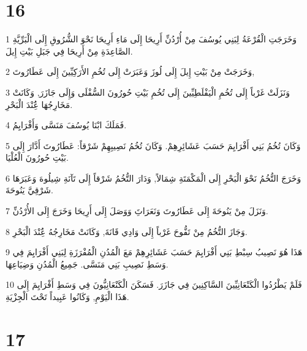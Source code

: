 \chapter{16}

\par 1 وَخَرَجَتِ الْقُرْعَةُ لِبَنِي يُوسُفَ مِنْ أُرْدُنِّ أَرِيحَا إِلَى مَاءِ أَرِيحَا نَحْوَ الشُّرُوقِ إِلَى الْبَرِّيَّةِ الصَّاعِدَةِ مِنْ أَرِيحَا فِي جَبَلِ بَيْتِ إِيلَ.
\par 2 وَخَرَجَتْ مِنْ بَيْتِ إِيلَ إِلَى لُوزَ وَعَبَرَتْ إِلَى تُخُمِ الأَرَكِيِّينَ إِلَى عَطَارُوتَ,
\par 3 وَنَزَلَتْ غَرْباً إِلَى تُخُمِ الْيَفْلَطِيِّينَ إِلَى تُخُمِ بَيْتِ حُورُونَ السُّفْلَى وَإِلَى جَازَرَ, وَكَانَتْ مَخَارِجُهَا عَُِنْدَ الْبَحْرِ.
\par 4 فَمَلَكَ ابْنَا يُوسُفَ مَنَسَّى وَأَفْرَايِمُ.
\par 5 وَكَانَ تُخُمُ بَنِي أَفْرَايِمَ حَسَبَ عَشَائِرِهِمْ. وَكَانَ تُخُمُ نَصِيبِهِمْ شَرْقاً: عَطَارُوتَ أَدَّارَ إِلَى بَيْتِ حُورُونَ الْعُلْيَا.
\par 6 وَخَرَجَ التُّخُمُ نَحْوَ الْبَحْرِ إِلَى الْمَكْمَتَةِ شِمَالاً, وَدَارَ التُّخُمُ شَرْقاً إِلَى تَآنَةِ شِيلُوهَ وَعَبَرَهَا شَرْقِيَّ يَنُوحَةَ.
\par 7 وَنَزَلَ مِنْ يَنُوحَةَ إِلَى عَطَارُوتَ وَنَعَرَاتَِ وَوَصَلَ إِلَى أَرِيحَا وَخَرَجَ إِلَى الأُرْدُنِّ.
\par 8 وَجَازَ التُّخُمُ مِنْ تَفُّوحَ غَرْباً إِلَى وَادِي قَانَةَ, وَكَانَتْ مَخَارِجُهُ عَُِنْدَ الْبَحْرِ.
\par 9 هَذَا هُوَ نَصِيبُ سِبْطِ بَنِي أَفْرَايِمَ حَسَبَ عَشَائِرِهِمْ مَعَ الْمُدُنِ الْمُفْرَزَةِ لِبَنِي أَفْرَايِمَ فِي وَسَطِ نَصِيبِ بَنِي مَنَسَّى. جَمِيعُ الْمُدُنِ وَضِيَاعِهَا.
\par 10 فَلَمْ يَطْرُدُوا الْكَنْعَانِيِّينَ السَّاكِنِينَ فِي جَازَرَ. فَسَكَنَ الْكَنْعَانِيُّونَ فِي وَسَطِ أَفْرَايِمَ إِلَى هَذَا الْيَوْمِ, وَكَانُوا عَبِيداً تَحْتَ الْجِزْيَةِ.

\chapter{17}

